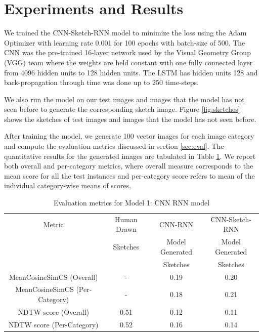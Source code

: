 \documentclass{article}
\begin{document}
\section{Experiments and Results} \label{sec:results}

We trained the CNN-Sketch-RNN model to minimize the loss using the Adam Optimizer with learning rate 0.001 for 100 epochs with batch-size of 500. The CNN was the pre-trained 16-layer network used by the Visual Geometry Group (VGG) team \cite{VGG} where the weights are held constant with one fully connected layer from 4096 hidden units to 128 hidden units. The LSTM has hidden units 128 and back-propagation through time was done up to 250 time-steps.

We also run the model on our test images and images that the model has not seen before to generate the corresponding sketch image. Figure \ref{fig:sketches} shows the sketches of test images and images that the model has not seen before.

After training the model, we generate 100 vector images for each image category and compute the evaluation metrics discussed in section \ref{sec:eval}. The quantitative results for the generated images are tabulated in Table \ref{table:results_model1}. We report both overall and per-category metrics, where overall measure corresponds to the mean score for all the test instances and per-category score refers to mean of the individual category-wise means of scores.

\begin{table}[H]
    \centering
    \begin{tabular}{c|c|c|c} \toprule
        Metric & Human Drawn & CNN-RNN & CNN-Sketch-RNN \\ 
         & Sketches & Model Generated & Model Generated \\ 
         &  & Sketches & Sketches \\
         \hline
        MeanCosineSimCS (Overall) & - & 0.19  & 0.20 \\ \hline
        MeanCosineSimCS (Per-Category) & - & 0.18  & 0.21 \\ \hline
        NDTW score (Overall) & 0.51 & 0.12  & 0.11 \\ \hline
        NDTW score (Per-Category) &  0.52 & 0.16 & 0.14 \\ \hline
    \end{tabular}

    \caption{Evaluation metrics for Model 1: CNN RNN model}
    \label{table:results_model1}
\end{table}{}
\end{document}
